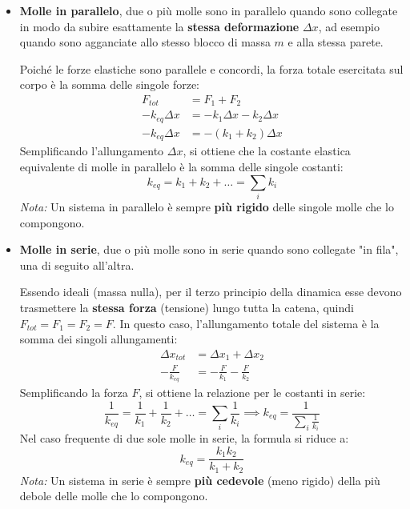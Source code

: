 \documentclass[11pt, a4paper, openright]{book}
\theoremstyle{plain}
\theoremstyle{definition}
\begin{document}
\begin{itemize}
    \item \textbf{Molle in parallelo},
        due o più molle sono in parallelo quando sono collegate in modo da subire esattamente la \textbf{stessa deformazione} $\Delta x$, ad esempio quando sono agganciate allo stesso blocco di massa $m$ e alla stessa parete.
        
        Poiché le forze elastiche sono parallele e concordi, la forza totale esercitata sul corpo è la somma delle singole forze:
        \begin{align}
            F_{tot} &= F_1 + F_2 \\
            -k_{eq} \Delta x &= -k_1 \Delta x - k_2 \Delta x \\
            -k_{eq} \Delta x &= -(k_1 + k_2)\Delta x
        \end{align}
        Semplificando l'allungamento $\Delta x$, si ottiene che la costante elastica equivalente di molle in parallelo è la somma delle singole costanti:
        \begin{equation}
            k_{eq} = k_1 + k_2 + \dots = \sum_{i} k_i
        \end{equation}
        \textit{Nota:} Un sistema in parallelo è sempre \textbf{più rigido} delle singole molle che lo compongono.
    \item \textbf{Molle in serie},
        due o più molle sono in serie quando sono collegate "in fila", una di seguito all'altra. 
        
        Essendo ideali (massa nulla), per il terzo principio della dinamica esse devono trasmettere la \textbf{stessa forza} (tensione) lungo tutta la catena, quindi $F_{tot} = F_1 = F_2 = F$.
        In questo caso, l'allungamento totale del sistema è la somma dei singoli allungamenti:
        \begin{align}
            \Delta x_{tot} &= \Delta x_1 + \Delta x_2 \\
            -\frac{F}{k_{eq}} &= -\frac{F}{k_1} - \frac{F}{k_2}
        \end{align}
        Semplificando la forza $F$, si ottiene la relazione per le costanti in serie:
        \begin{equation}
            \frac{1}{k_{eq}} = \frac{1}{k_1} + \frac{1}{k_2} + \dots = \sum_{i} \frac{1}{k_i} \implies k_{eq} = \frac{1}{\sum_i \frac{1}{k_i}}
        \end{equation}
        Nel caso frequente di due sole molle in serie, la formula si riduce a:
        \[ k_{eq} = \frac{k_1 k_2}{k_1 + k_2} \]
        \textit{Nota:} Un sistema in serie è sempre \textbf{più cedevole} (meno rigido) della più debole delle molle che lo compongono.
        
\end{itemize}
\end{document}
